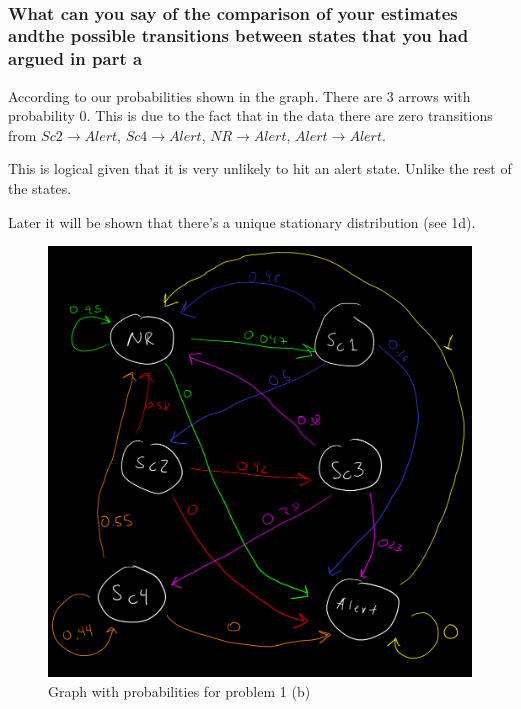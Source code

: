 \documentclass[
]{article}
\begin{document}
~

\hypertarget{what-can-you-say-of-the-comparison-of-your-estimates-andthe-possible-transitions-between-states-that-you-had-argued-in-part-a}{%
\subsubsection{What can you say of the comparison of your estimates
andthe possible transitions between states that you had argued in part
a}\label{what-can-you-say-of-the-comparison-of-your-estimates-andthe-possible-transitions-between-states-that-you-had-argued-in-part-a}}

According to our probabilities shown in the graph. There are 3 arrows
with probability 0. This is due to the fact that in the data there are
zero transitions from \(Sc2 \rightarrow Alert\),
\(Sc4 \rightarrow Alert\), \(NR \rightarrow Alert\),
\(Alert \rightarrow Alert\).

This is logical given that it is very unlikely to hit an alert state.
Unlike the rest of the states.

Later it will be shown that there's a unique stationary distribution
(see 1d).

\begin{figure}
\centering
\includegraphics{./grafo1_probs.png}
\caption{Graph with probabilities for problem 1 (b)}
\end{figure}
\end{document}
